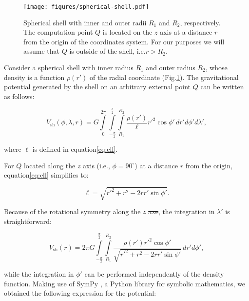 \documentclass[extra, referee]{gji}
\providecommand{\DIFaddtex}[1]{{\protect\color{blue}\uwave{#1}}} %
\providecommand{\DIFdeltex}[1]{{\protect\color{red}\sout{#1}}}                      %
\providecommand{\DIFaddbegin}{} %
\providecommand{\DIFaddend}{} %
\providecommand{\DIFdelbegin}{} %
\providecommand{\DIFdelend}{} %
\providecommand{\DIFaddFL}[1]{\DIFadd{#1}} %
\providecommand{\DIFaddbeginFL}{} %
\providecommand{\DIFaddendFL}{} %
\providecommand{\DIFadd}[1]{\texorpdfstring{\DIFaddtex{#1}}{#1}} %
\providecommand{\DIFdel}[1]{\texorpdfstring{\DIFdeltex{#1}}{}} %
\newcommand{\DIFscaledelfig}{0.5}
\newlength{\DIFdelgraphicswidth} %
\newlength{\DIFdelgraphicsheight} %
\newcommand{\DIFaddincludegraphics}[2][]{{\color{blue}\fbox{\DIFOincludegraphics[#1]{#2}}}} %
\newcommand{\DIFdelincludegraphics}[2][]{%
\sbox{\DIFdelgraphicsbox}{\DIFOincludegraphics[#1]{#2}}%
\settoboxwidth{\DIFdelgraphicswidth}{\DIFdelgraphicsbox} %
\settoboxtotalheight{\DIFdelgraphicsheight}{\DIFdelgraphicsbox} %
\scalebox{\DIFscaledelfig}{%
\parbox[b]{\DIFdelgraphicswidth}{\usebox{\DIFdelgraphicsbox}\\[-\baselineskip] \rule{\DIFdelgraphicswidth}{0em}}\llap{\resizebox{\DIFdelgraphicswidth}{\DIFdelgraphicsheight}{%
\setlength{\unitlength}{\DIFdelgraphicswidth}%
\begin{picture}(1,1)%
\thicklines\linethickness{2pt} %
{\color[rgb]{1,0,0}\put(0,0){\framebox(1,1){}}}%
{\color[rgb]{1,0,0}\put(0,0){\line( 1,1){1}}}%
{\color[rgb]{1,0,0}\put(0,1){\line(1,-1){1}}}%
\end{picture}%
}\hspace*{3pt}}} %
} %
\DeclareRobustCommand{\DIFaddbegin}{\DIFOaddbegin \let\includegraphics\DIFaddincludegraphics} %
\DeclareRobustCommand{\DIFaddend}{\DIFOaddend \let\includegraphics\DIFOincludegraphics} %
\DeclareRobustCommand{\DIFdelbegin}{\DIFOdelbegin \let\includegraphics\DIFdelincludegraphics} %
\DeclareRobustCommand{\DIFdelend}{\DIFOaddend \let\includegraphics\DIFOincludegraphics} %
\DeclareRobustCommand{\DIFaddbeginFL}{\DIFOaddbeginFL \let\includegraphics\DIFaddincludegraphics} %
\DeclareRobustCommand{\DIFaddendFL}{\DIFOaddendFL \let\includegraphics\DIFOincludegraphics} %
\begin{document}
\begin{figure}
\centering
\texttt{[image: figures/spherical-shell.pdf]}
\caption{
    Spherical shell with inner and outer radii $R_1$ and $R_2$, respectively.
    The computation point $Q$ is located on the $z$ axis at a distance $r$ from
    the origin of the coordinates system.
    For our purposes we will assume that $Q$ is outside of the shell,
    i.e.\DIFaddbeginFL \DIFaddFL{~}\DIFaddendFL $r > R_2$.
}
\label{fig:spherical-shell}
\end{figure}

Consider a spherical shell with inner radius $R_1$ and outer radius $R_2$,
whose density is a function $\rho(r')$ of the radial coordinate
(Fig.\DIFaddbegin \DIFadd{~}\DIFaddend \ref{fig:spherical-shell}).
The gravitational potential generated by the shell on an arbitrary external
point $Q$ can be written as follows:

\begin{equation}
    V_\text{sh}(\phi, \lambda, r) = G
    \int\limits_0^{2\pi}
    \int\limits_{-\frac{\pi}{2}}^\frac{\pi}{2}
    \int\limits_{R_1}^{R_2}
    \frac{\rho(r')}{\ell} {r'}^2 \cos\phi' \,
    dr' d\phi' d\lambda',
\end{equation}

\noindent where $\ell$ is defined in equation\DIFaddbegin \DIFadd{~}\DIFaddend \ref{eq:ell}.

For $Q$ located along the $z$ axis (i.e., $\phi=90^\circ$) at a distance $r$ from the
origin, equation\DIFaddbegin \DIFadd{~}\DIFaddend \ref{eq:ell} simplifies to:

\begin{equation}
    \ell = \sqrt{r'^2 + r^2 - 2 r r' \sin\phi'}.
\end{equation}

\noindent
Because of the rotational symmetry along the $z$ \DIFdelbegin \DIFdel{axe}\DIFdelend \DIFaddbegin \DIFadd{axis}\DIFaddend , the integration in $\lambda'$ is
straightforward:

\begin{equation}
    V_\text{sh}(r) = 2\pi G
    \int\limits_{-\frac{\pi}{2}}^\frac{\pi}{2}
    \int\limits_{R_1}^{R_2}
    \frac{\rho(r') {r'}^2 \cos\phi'}{\sqrt{r'^2 + r^2 - 2 r r' \sin\phi'}}
    \, dr' d\phi',
\end{equation}

\noindent
while the integration in $\phi'$ can be performed independently of the density function.
Making use of SymPy \citep{sympy2017}, a Python library for symbolic mathematics, we
obtained the following expression for the potential:
\end{document}

